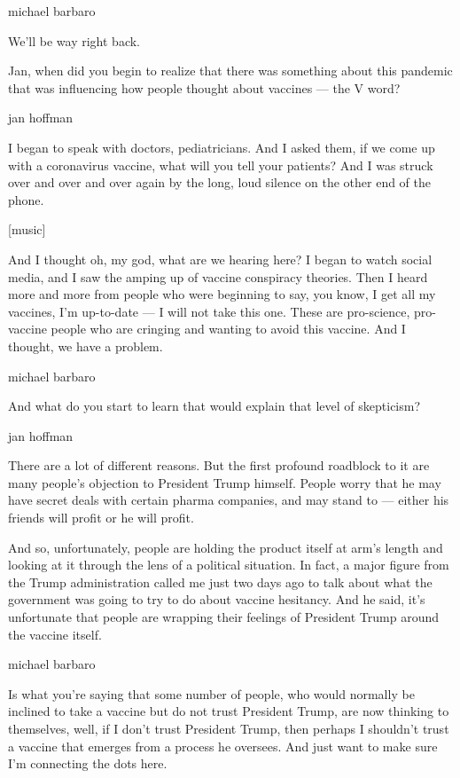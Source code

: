 michael barbaro

We'll be way right back.

Jan, when did you begin to realize that there was something about this
pandemic that was influencing how people thought about vaccines --- the
V word?

jan hoffman

I began to speak with doctors, pediatricians. And I asked them, if we
come up with a coronavirus vaccine, what will you tell your patients?
And I was struck over and over and over again by the long, loud silence
on the other end of the phone.

{[}music{]}

And I thought oh, my god, what are we hearing here? I began to watch
social media, and I saw the amping up of vaccine conspiracy theories.
Then I heard more and more from people who were beginning to say, you
know, I get all my vaccines, I'm up-to-date --- I will not take this
one. These are pro-science, pro-vaccine people who are cringing and
wanting to avoid this vaccine. And I thought, we have a problem.

michael barbaro

And what do you start to learn that would explain that level of
skepticism?

jan hoffman

There are a lot of different reasons. But the first profound roadblock
to it are many people's objection to President Trump himself. People
worry that he may have secret deals with certain pharma companies, and
may stand to --- either his friends will profit or he will profit.

And so, unfortunately, people are holding the product itself at arm's
length and looking at it through the lens of a political situation. In
fact, a major figure from the Trump administration called me just two
days ago to talk about what the government was going to try to do about
vaccine hesitancy. And he said, it's unfortunate that people are
wrapping their feelings of President Trump around the vaccine itself.

michael barbaro

Is what you're saying that some number of people, who would normally be
inclined to take a vaccine but do not trust President Trump, are now
thinking to themselves, well, if I don't trust President Trump, then
perhaps I shouldn't trust a vaccine that emerges from a process he
oversees. And just want to make sure I'm connecting the dots here.


